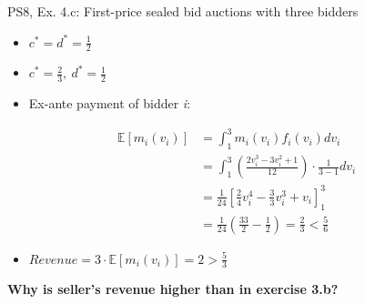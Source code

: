 \begin{frame}{PS8, Ex. 4.c: First-price sealed bid auctions with three bidders}
\begin{multicols}{2}
\begin{itemize}
        \item[(3.a)] $c^*=d^*=\frac{1}{2}$
        \item[(4.a)] $c^*=\frac{2}{3},\ d^*=\frac{1}{2}$
        \item[\nth{2}:] Ex-ante payment of bidder \textit{i}:
      \end{itemize}
      \vspace{-12pt}
      \begin{align*}
        \mathbb{E}[m_i(v_i)]&=\textstyle\int_1^3m_i(v_i)f_i(v_i)dv_i\\
                            &=\textstyle\int_1^3\left(\frac{2v_i^3-3v_i^2+1}{12}\right)\cdot\frac{1}{3-1}dv_i\\
                            &=\frac{1}{24}\left[\frac{2}{4}v_i^4-\frac{3}{3}v_i^3+v_i\right]_1^3\\
                            &=\frac{1}{24}\left(\frac{33}{2}-\frac{1}{2}\right)=\frac{2}{3}<\frac{5}{6}
      \end{align*}
      \vspace{-16pt}
      \begin{itemize}
        \item[\nth{3}:] $Revenue=3\cdot\mathbb{E}[m_i(v_i)]=2>\frac{5}{3}$
      \end{itemize}
      \vspace{-6pt}
      \textbf{Why is seller’s revenue higher than in exercise 3.b?}
      \vfill\null
    \end{multicols}
    \vfill\null
\end{frame}
